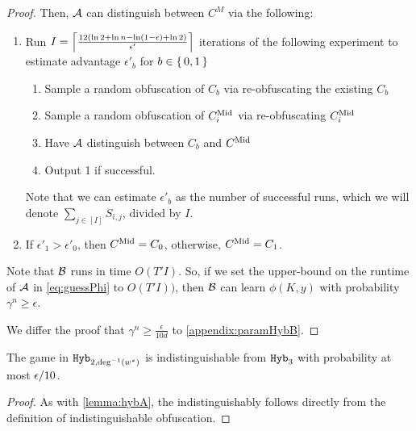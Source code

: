 \begin{lemma}
\begin{proof}
		Then, $\mathcal{A}$ can distinguish between $C^M$ via the following:
		\begin{enumerate}
			\item Run $I =\left\lceil 
			\frac{12\left(\ln 2 + \ln n - \ln\left(1 - \epsilon\right) + \ln 2\right)}{\epsilon'} \right\rceil$ iterations of the following experiment to estimate advantage $\epsilon'_b$ for $b \in \set{0, 1}$
				\begin{enumerate}
					\item Sample a random obfuscation of $C_b$ via re-obfuscating the existing $C_b$
					\item Sample a random obfuscation of $C^{\text{Mid}}_i$ via re-obfuscating $C^{\text{Mid}}_i$
					\item Have $\mathcal{A}$ distinguish between $C_b$ and $C^{\text{Mid}}$
					\item Output 1 if successful.
				\end{enumerate}
			Note that we can estimate $\epsilon'_b$ as the number of successful runs, which we will denote $\sum_{j \in [I]} S_{i, j}$, divided by $I$.
			\item If $\epsilon'_1 > \epsilon'_0$, then $C^{\text{Mid}} = C_0$, otherwise, $C^{\text{Mid}} = C_1$.
		\end{enumerate}

		Note that $\mathcal{B}$ runs in time $O(T' I)$. So, if we set the upper-bound on the runtime of $\mathcal{A}$ in \cref{eq:guessPhi}
		to $O(T' I))$, then $\mathcal{B}$ can learn $\phi(K, y)$ with probability $\gamma^n \geq \epsilon$.

		We differ the proof that $\gamma^n \geq \frac{\epsilon}{10d}$ to \cref{appendix:paramHybB}.
	\end{proof}
	
\end{lemma}

\begin{lemma}
	The game in $\texttt{Hyb}_{2, \deg^{-1}(w^*)}$ is indistinguishable from $\texttt{Hyb}_3$ with probability
	at most $\epsilon/10$.
	\begin{proof}
		As with \cref{lemma:hybA}, 
		the indistinguishably follows directly from the definition of indistinguishable obfuscation.
	\end{proof}
\end{lemma}

